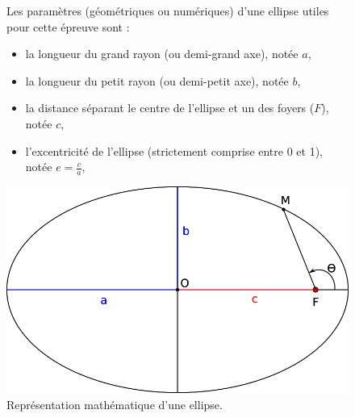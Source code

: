 \begin{figure}[ht!]
\begin{minipage}{0.48\linewidth}
Les paramètres (géométriques ou numériques) d'une ellipse utiles pour cette épreuve sont :
\begin{itemize}
 \item la longueur du grand rayon (ou demi-grand axe), notée $a$,
 \item la longueur du petit rayon (ou demi-petit axe), notée $b$,
 \item la distance séparant le centre de l'ellipse et un des foyers ($F$), notée $c$,
 \item l'excentricité de l’ellipse (strictement comprise entre 0 et 1), notée $e=\frac{c}{a}$,
\end{itemize}
\end{minipage}\hfill
\begin{minipage}{0.48\linewidth}
  \begin{center}
  \includegraphics[width=0.9\linewidth]{img/ellipse}
  \caption{Représentation mathématique d'une ellipse.}
  \label{ellispe}
  \end{center} 
\end{minipage}
\end{figure}

